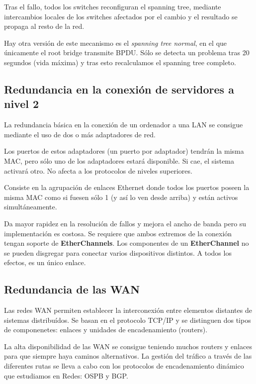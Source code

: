 Tras el fallo, todos los switches reconfiguran el spanning tree, mediante intercambios locales de los switches afectados por el cambio y el resultado se propaga al resto de la red.

\obs Hay otra versión de este mecanismo es el \textit{spanning tree normal}, en el que únicamente el root bridge transmite BPDU. Sólo se detecta un problema tras 20 segundos (vida máxima) y tras esto recalculamos el spanning tree completo.

\subsection{Redundancia en la conexión de servidores a nivel 2}
La redundancia básica en la conexión de un ordenador a una LAN se consigue mediante el uso de dos o más adaptadores de red.

Los puertos de estos adaptadores (un puerto por adaptador) tendrán la misma MAC, pero sólo uno de los adaptadores estará disponible. Si cae, el sistema activará otro. No afecta a los protocolos de niveles superiores.

\begin{defn}[EtherChannels]
Consiste en la agrupación de enlaces Ethernet donde todos los puertos poseen la misma MAC como si fuesen sólo 1 (y así lo ven desde arriba) y están activos simultáneamente.

Da mayor rapidez en la resolución de fallos y mejora el ancho de banda pero su implementación es costosa. Se requiere que ambos extremos de la conexión tengan soporte de \textbf{EtherChannels}. Los componentes de un \textbf{EtherChannel} no se pueden disgregar para conectar varios dispositivos distintos. A todos los efectos, es un único enlace.

\end{defn}

\subsection{Redundancia de las WAN}
Las redes WAN permiten establecer la interconexión entre elementos distantes de sistemas distribuídos. Se basan en el protocolo TCP/IP y se distinguen dos tipos de componenetes: enlaces y unidades de encadenamiento (routers).

La alta disponibilidad de las WAN se consigue teniendo muchos routers y enlaces para que siempre haya caminos alternativos. La gestión del tráfico a través de las diferentes rutas se lleva a cabo con los protocolos de encadenamiento dinámico que estudiamos en Redes: OSPB y BGP.

